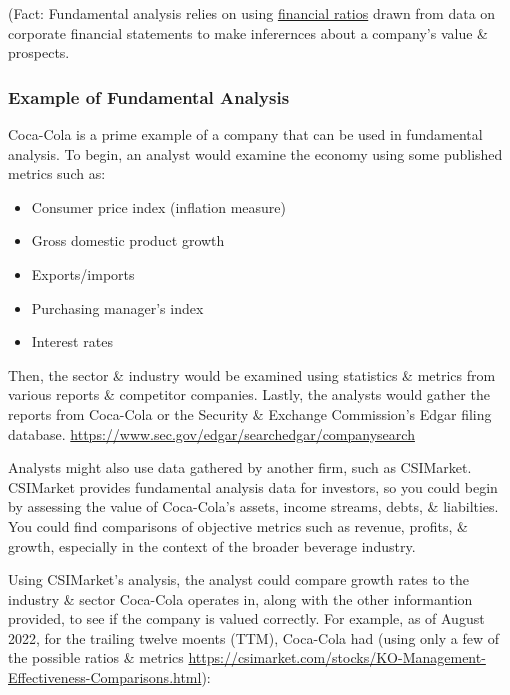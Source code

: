 \documentclass{article}
\begin{document}
	(Fact: Fundamental analysis relies on using \href{https://www.investopedia.com/financial-ratios-4689817}{financial ratios} drawn from data on corporate financial statements to make inferernces 
	about a company's value \& prospects. \newline \newline

	\subsubsection{Example of Fundamental Analysis}

	Coca-Cola is a prime example of a company that can be used in fundamental analysis. To begin, an analyst would examine the economy using some published metrics such as:

	\begin{itemize}
		\item Consumer price index (inflation measure)
		\item Gross domestic product growth
		\item Exports/imports
		\item Purchasing manager's index
		\item Interest rates
	\end{itemize}

	Then, the sector \& industry would be examined using statistics \& metrics from various reports \& competitor companies. Lastly, the analysts would gather the reports from Coca-Cola or the 
	Security \& Exchange Commission's Edgar filing database. \url{https://www.sec.gov/edgar/searchedgar/companysearch} \newline

	Analysts might also use data gathered by another firm, such as CSIMarket. CSIMarket provides fundamental analysis data for investors, so you could begin by assessing the value of Coca-Cola's
	assets, income streams, debts, \& liabilties. You could find comparisons of objective metrics such as revenue, profits, \& growth, especially in the context of the broader beverage industry. \newline

	Using CSIMarket's analysis, the analyst could compare growth rates to the industry \& sector Coca-Cola operates in, along with the other informantion provided, to see if the company is valued 
	correctly. For example, as of August 2022, for the trailing twelve moents (TTM), Coca-Cola had (using only a few of the possible ratios \& metrics \url{https://csimarket.com/stocks/KO-Management-Effectiveness-Comparisons.html}): \newline \newline
\end{document}
